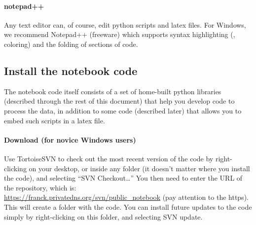 \paragraph{notepad++}
Any text editor can, of course, edit
    python scripts and latex files.
For Windows,
    we recommend Notepad++ (freeware)
    which supports syntax highlighting (\ie, coloring)
    and the folding of sections of code.
\subsection{Install the notebook code}
The notebook code itself consists of a set of home-built
    python libraries
    (described through the rest of this document)
    that help you develop code to process the data,
    in addition to some code (described later)
    that allows you to embed such scripts in a latex file.
\paragraph{Download (for novice Windows users)}
Use TortoiseSVN to check out the
    most recent version of the code
    by right-clicking on your desktop,
    or inside any folder
    (it doesn't matter where you install the code),
    and selecting ``SVN Checkout\ldots''
You then need to enter the URL of the repository, which is:
    \\ \url{https://franck.privatedns.org/svn/public\_notebook}
    (pay attention to the https).\\ 
This will create a folder with the code.
You can install future updates to the code
    simply by right-clicking on this folder,
    and selecting SVN update.
